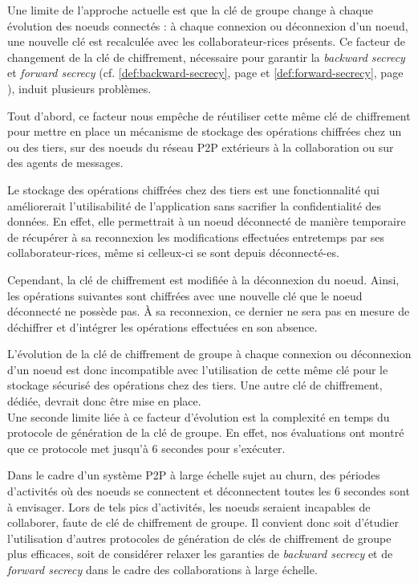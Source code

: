 Une limite de l'approche actuelle est que la clé de groupe change à chaque évolution des noeuds connectés : à chaque connexion ou déconnexion d'un noeud, une nouvelle clé est recalculée avec les collaborateur-rices présents.
Ce facteur de changement de la clé de chiffrement, nécessaire pour garantir la \emph{backward secrecy} et \emph{forward secrecy} (cf. \autoref{def:backward-secrecy}, page \pageref{def:backward-secrecy} et \autoref{def:forward-secrecy}, page \pageref{def:forward-secrecy}), induit plusieurs problèmes.

Tout d'abord, ce facteur nous empêche de réutiliser cette même clé de chiffrement pour mettre en place un mécanisme de stockage des opérations chiffrées chez un ou des tiers, \eg sur des noeuds du réseau \ac{P2P} extérieurs à la collaboration ou sur des agents de messages.

Le stockage des opérations chiffrées chez des tiers est une fonctionnalité qui améliorerait l'utilisabilité de l'application sans sacrifier la confidentialité des données.
En effet, elle permettrait à un noeud déconnecté de manière temporaire de récupérer à sa reconnexion les modifications effectuées entretemps par ses collaborateur-rices, même si celleux-ci se sont depuis déconnecté-es.

Cependant, la clé de chiffrement est modifiée à la déconnexion du noeud.
Ainsi, les opérations suivantes sont chiffrées avec une nouvelle clé que le noeud déconnecté ne possède pas.
À sa reconnexion, ce dernier ne sera pas en mesure de déchiffrer et d'intégrer les opérations effectuées en son absence.

L'évolution de la clé de chiffrement de groupe à chaque connexion ou déconnexion d'un noeud est donc incompatible avec l'utilisation de cette même clé pour le stockage sécurisé des opérations chez des tiers.
Une autre clé de chiffrement, dédiée, devrait donc être mise en place.\\

Une seconde limite liée à ce facteur d'évolution est la complexité en temps du protocole de génération de la clé de groupe.
En effet, nos évaluations ont montré que ce protocole met jusqu'à 6 secondes pour s'exécuter.

Dans le cadre d'un système \ac{P2P} à large échelle sujet au churn, des périodes d'activités où des noeuds se connectent et déconnectent toutes les 6 secondes sont à envisager.
Lors de tels pics d'activités, les noeuds seraient incapables de collaborer, faute de clé de chiffrement de groupe.
Il convient donc soit d'étudier l'utilisation d'autres protocoles de génération de clés de chiffrement de groupe plus efficaces, soit de considérer relaxer les garanties de \emph{backward secrecy} et de \emph{forward secrecy} dans le cadre des collaborations à large échelle.
